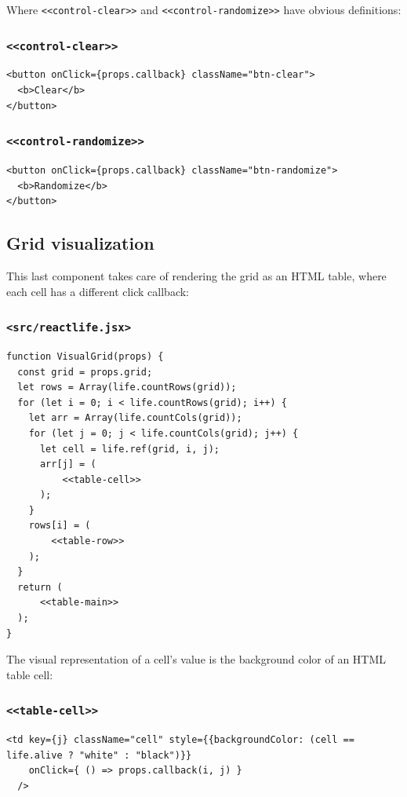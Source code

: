\documentclass[11pt]{article}
\begin{document}
Where \texttt{<<control-clear>>} and \texttt{<<control-randomize>>} have obvious definitions:

\subsubsection*{\texttt{<<control-clear>>}}
\label{sec:org1374dae}
\begin{verbatim}
<button onClick={props.callback} className="btn-clear">
  <b>Clear</b>
</button>
\end{verbatim}

\subsubsection*{\texttt{<<control-randomize>>}}
\label{sec:orgecbddcc}
\begin{verbatim}
<button onClick={props.callback} className="btn-randomize">
  <b>Randomize</b>
</button>
\end{verbatim}

\subsection{Grid visualization}
\label{sec:org554eb03}

This last component takes care of rendering the grid as an HTML table, where each cell has a different click callback:

\subsubsection*{\texttt{<src/reactlife.jsx>}}
\label{sec:org08d783b}
\begin{verbatim}
function VisualGrid(props) {
  const grid = props.grid;
  let rows = Array(life.countRows(grid));
  for (let i = 0; i < life.countRows(grid); i++) {
    let arr = Array(life.countCols(grid));
    for (let j = 0; j < life.countCols(grid); j++) {
      let cell = life.ref(grid, i, j);
      arr[j] = (
          <<table-cell>>
      );
    }
    rows[i] = (
        <<table-row>>
    );
  }
  return (
      <<table-main>>
  );
}
\end{verbatim}

The visual representation of a cell's value is the background color of an HTML table cell:

\subsubsection*{\texttt{<<table-cell>>}}
\label{sec:orgc454e14}
\begin{verbatim}
<td key={j} className="cell" style={{backgroundColor: (cell == life.alive ? "white" : "black")}}
    onClick={ () => props.callback(i, j) }
  />
\end{verbatim}
\end{document}
